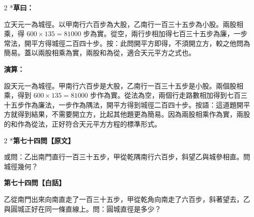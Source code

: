 \documentclass[11pt,a4paper]{article}
\begin{document}
\begin{paracol}{2}
\switchcolumn[0]*\textbf{草曰：}

\small 立天元一為城徑。以甲南行六百步為大股，乙南行一百三十五步為小股。兩股相乘，得 $600 \times 135 = 81000$ 步為實。從空，兩行步相加得七百三十五步為廉，一步常法，開平方得城徑二百四十步。按：此問開平方即得，不須開立方，較之他問為簡易。蓋以兩股相乘為實，兩股和為從，適合天元平方之式也。

\switchcolumn\textbf{演算：}

\small 設天元一為城徑。甲南行六百步是大股，乙南行一百三十五步是小股。兩個股相乘，得到 $600 \times 135 = 81000$ 步作為實。從法為空，兩個行走路數相加得到七百三十五步作為廉法，一步作為隅法，開平方得到城徑二百四十步。按語：這道題開平方就得到結果，不需要開立方，比起其他題更為簡易。因為兩股相乘作為實，兩股的和作為從法，正好符合天元平方方程的標準形式。
\end{paracol}

\vspace{0.1cm}
\noindent{}
\par\vspace{0.3cm}

\begin{paracol}{2}
\switchcolumn[0]*\noindent\textbf{第七十四問【原文】}

\small 或問：乙出南門直行一百三十五步，甲從乾隅南行六百步，斜望乙與城參相直。問城徑幾何？

\switchcolumn\noindent\textbf{第七十四問【白話】}

\small 乙從南門出來向南直走了一百三十五步，甲從乾角向南走了六百步，斜著望去，乙與圓城正好在同一條直線上。問：圓城直徑是多少？
\end{paracol}

\vspace{0.1cm}
\noindent{}
\par\vspace{0.15cm}
\end{document}
